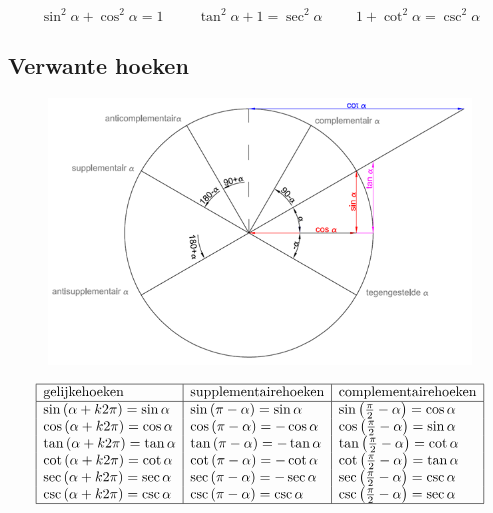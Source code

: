 \documentclass[a5paper]{article}
\begin{document}
\[
\boxed{\sin^2{\alpha} + \cos^2{\alpha} = 1} \hspace{1cm}
\boxed{\tan^2{\alpha} + 1 = \sec^2{\alpha}} \hspace{1cm}
\boxed{1 + \cot^2{\alpha} = \csc^2{\alpha}}
\]

\newpage
\subsection{Verwante hoeken}
\begin{figure}
    \centering
    \includegraphics[width=1\linewidth]{image_goniometrie_verwante_hoeken.png}
  
    \label{fig:enter-label}
\end{figure}

\[
\begin{array}{|l|l|l|}
\hline
\text{gelijkehoeken} & \text{supplementairehoeken} & \text{complementairehoeken} \\
\hline
\sin{\left(\alpha + k2\pi\right)} = \sin{\alpha} & \sin{\left(\pi - \alpha\right)} = \sin{\alpha} & \sin{\left(\frac{\pi}{2} - \alpha\right)} = \cos{\alpha} \\
\cos{\left(\alpha + k2\pi\right)} = \cos{\alpha} & \cos{\left(\pi - \alpha\right)} = -\cos{\alpha} & \cos{\left(\frac{\pi}{2} - \alpha\right)} = \sin{\alpha} \\
\tan{\left(\alpha + k2\pi\right)} = \tan{\alpha} & \tan{\left(\pi - \alpha\right)} = -\tan{\alpha} & \tan{\left(\frac{\pi}{2} - \alpha\right)} = \cot{\alpha} \\
\cot{\left(\alpha + k2\pi\right)} = \cot{\alpha} & \cot{\left(\pi - \alpha\right)} = -\cot{\alpha} & \cot{\left(\frac{\pi}{2} - \alpha\right)} = \tan{\alpha} \\
\sec{\left(\alpha + k2\pi\right)} = \sec{\alpha} & \sec{\left(\pi - \alpha\right)} = -\sec{\alpha} & \sec{\left(\frac{\pi}{2} - \alpha\right)} = \csc{\alpha} \\
\csc{\left(\alpha + k2\pi\right)} = \csc{\alpha} & \csc{\left(\pi - \alpha\right)} = \csc{\alpha} & \csc{\left(\frac{\pi}{2} - \alpha\right)} = \sec{\alpha} \\
\hline
\end{array}
\]
\end{document}
